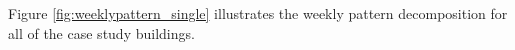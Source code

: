 Figure \ref{fig:weeklypattern_single} illustrates the weekly pattern decomposition for all of the case study buildings. 